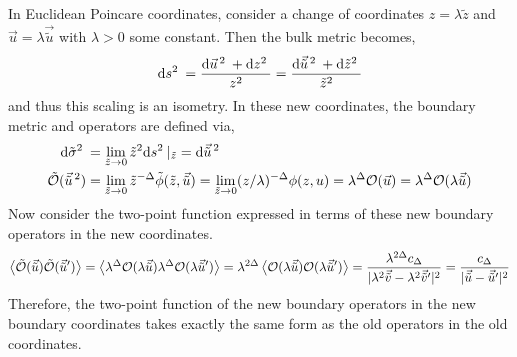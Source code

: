 \documentclass[12pt]{article}
\begin{document}
\subsection{}

In Euclidean Poincare coordinates, consider a change of coordinates $z = \lambda \tilde{z}$ and $\vec{u} = \lambda \vec{\tilde{u}}$ with $\lambda > 0$ some constant. Then the bulk metric becomes,
\[ \mathrm{d}s^2 \: = \frac{\mathrm{d}\vec{u}^{\, 2} \: + \mathrm{d}z^2 \:}{z^2} = \frac{\mathrm{d}\vec{\tilde{u}}^{\, 2} \: + \mathrm{d}\tilde{z}^2 \:}{\tilde{z}^2} \]
and thus this scaling is an isometry. In these new coordinates, the boundary metric and operators are defined via,
\newcommand{\vt}[1]{\vec{\tilde{#1}}}
\newcommand{\vts}[1]{\vec{\tilde{#1}}^{\, 2}}
\begin{align*}
\d{\tilde{\sigma}^2} & = \lim_{\tilde{z} \to 0} \tilde{z}^2 \d{s^2}|_{\tilde{z}} = \d{\vec{\tilde{u}}^{\, 2}}
\\
\tilde{\Op}(\vts{u}) & = \lim_{\tilde{z} \to 0} \tilde{z}^{-\Delta} \tilde{\phi}(\tilde{z}, \vt{u}) = \lim_{\tilde{z} \to 0} (z / \lambda)^{-\Delta} \phi(z, u) = \lambda^\Delta \Op(\vec{u}) = \lambda^\Delta \Op(\lambda \vt{u})
\end{align*}
Now consider the two-point function expressed in terms of these new boundary operators in the new coordinates.
\begin{align*}
\EV{\tilde{\Op}(\vt{u}) \tilde{\Op}(\vt{u}')} = \EV{\lambda^\Delta \Op(\lambda \vt{u}) \lambda^{\Delta} \Op(\lambda \vt{u}')} = \lambda^{2 \Delta} \EV{\Op(\lambda \vt{u})  \Op(\lambda \vt{u}')} = \frac{\lambda^{2 \Delta} c_\Delta}{|\lambda^2 \vt{v} - \lambda^2 \vt{v}'|^2} = \frac{c_\Delta}{|\vt{u} - \vt{u}'|^2}
\end{align*}
Therefore, the two-point function of the new boundary operators in the new boundary coordinates takes exactly the same form as the old operators in the old coordinates.

\subsection{}
\end{document}
